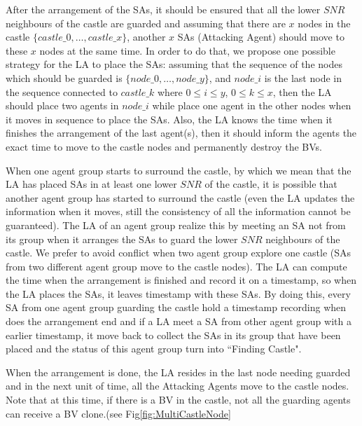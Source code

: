 After the arrangement of the SAs, it should be ensured that all the lower $SNR$ neighbours of the castle are guarded and assuming that there are $x$ nodes in the castle $\{castle\_0, \ldots, castle\_x\}$, another $x$ SAs (Attacking Agent) should move to these $x$ nodes at the same time. In order to do that, we propose one possible strategy for the LA to place the SAs: assuming that the sequence of the nodes which should be guarded is $\{node\_0, \ldots, node\_y\}$, and $node\_i$ is the last node in the sequence connected to $castle\_k$ where $0\leq i\leq y$, $0\leq k\leq x$, then the LA should place two agents in $node\_i$ while place one agent in the other nodes when it moves in sequence to place the SAs. Also, the LA knows the time when it finishes the arrangement of the last agent(s), then it should inform the agents the exact time to move to the castle nodes and permanently destroy the BVs.

When one agent group starts to surround the castle, by which we mean that the LA has placed SAs in at least one lower $SNR$ of the castle, it is possible that another agent group has started to surround the castle (even the LA updates the information when it moves, still the consistency of all the information cannot be guaranteed). The LA of an agent group realize this by meeting an SA not from its group when it arranges the SAs to guard the lower $SNR$ neighbours of the castle. We prefer to avoid conflict when two agent group explore one castle (SAs from two different agent group move to the castle nodes). The LA can compute the time when the arrangement is finished and record it on a timestamp, so when the LA places the SAs, it leaves timestamp with these SAs. By doing this, every SA from one agent group guarding the castle hold a timestamp recording when does the arrangement end and if a LA meet a SA from other agent group with a earlier timestamp, it move back to collect the SAs in its group that have been placed and the status of this agent group turn into ``Finding Castle". 

When the arrangement is done, the LA resides in the last node needing guarded and in the next unit of time, all the Attacking Agents move to the castle nodes. Note that at this time, if there is a BV in the castle, not all the guarding agents can receive a BV clone.(see Fig\ref{fig:MultiCastleNode}

